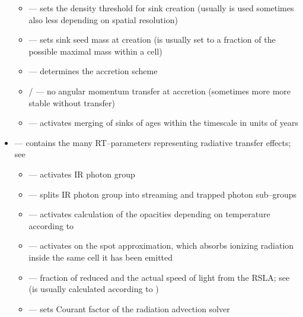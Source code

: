 \begin{itemize}
\begin{itemize}
    \item {} --- sets the density threshold for sink creation (usually  is used sometimes also less depending on spatial resolution)\\[-9pt]
    \item {} --- sets sink seed mass at creation (is usually set to a fraction of the possible maximal mass within a cell)\\[-9pt]
    \item {} --- determines the accretion scheme\\[-9pt]
    \item {}/ --- no angular momentum transfer at accretion (sometimes more more stable without transfer)\\[-9pt]
    \item {} --- activates merging of sinks of ages within the timescale in units of years\\[-3pt]
  \end{itemize}
  \item {} \quad --- contains the many RT--parameters representing radiative transfer effects; see \citet{Joki_RT}\\[-9pt]
  \begin{itemize}
    \item {} --- activates IR photon group\\[-9pt]
    \item {} --- splits IR photon group into streaming and trapped photon sub--groups\\[-9pt]
    \item {} --- activates calculation of the opacities depending on temperature according to \citet{Davisetal}\\[-9pt]
    \item {} --- activates on the spot approximation, which absorbs ionizing radiation inside the same cell it has been emitted\\[-9pt]
    \item {} --- fraction of reduced and the actual speed of light from the RSLA; see  (is usually calculated according to \citet{Skinner_Ostriker})\\[-9pt]
    \item {} --- sets Courant factor of the radiation advection solver\\[-9pt]

\end{itemize}
\end{itemize}
